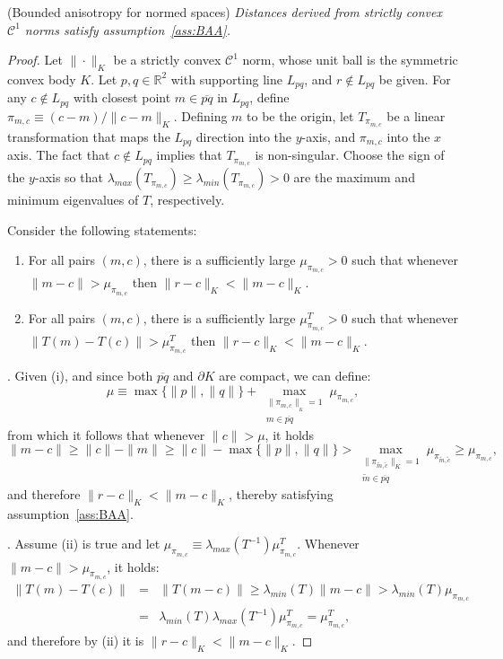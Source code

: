 \documentclass[11pt]{article}
\begin{document}
 (Bounded anisotropy for normed spaces)\emph{
	Distances derived from strictly convex $\mathcal{C}^1$ norms satisfy assumption~\ref{ass:BAA}.
}
\begin{proof}
Let $\|\cdot\|_K$ be a strictly convex $\mathcal{C}^1$ norm, whose unit ball is the symmetric convex body $K$. 
Let $p,q\in\mathbb{R}^2$ with supporting line $L_{pq}$, and $r\notin L_{pq}$ be given. 
For any $c\notin L_{pq}$ with closest point $m\in\overline{pq}$ in $L_{pq}$, define $\pi_{m,c} \equiv (c-m) / \|c-m\|_K$. 
Defining $m$ to be the origin, let $T_{\pi_{m,c}}$ be a linear transformation that maps the $L_{pq}$ direction into the ${y}$-axis, 
	and $\pi_{m,c}$ into the $x$ axis. 
The fact that $c\notin L_{pq}$ implies that $T_{\pi_{m,c}}$ is non-singular. 
Choose the sign of the $y$-axis so that $\lambda_{max}(T_{\pi_{m,c}}) \ge \lambda_{min}(T_{\pi_{m,c}}) > 0$ 
	are the maximum and minimum eigenvalues of $T$, 	respectively. 

Consider the following statements:
\begin{enumerate}[i]
\item For all pairs $(m,c)$, there is a sufficiently large $\mu_{\pi_{m,c}} > 0$ such that whenever 
	$\|m-c\| > \mu_{\pi_{m,c}}$ then $\|r-c\|_K < \|m-c\|_K$. 
\item For all pairs $(m,c)$, there is a sufficiently large $\mu^T_{\pi_{m,c}} > 0$ such that whenever
	$\|T(m) - T(c)\| > \mu^T_{\pi_{m,c}}$ then $\|r-c\|_K < \|m-c\|_K$. 
\end{enumerate}
	
\vspace*{0.05in}. 	
Given (i), and since both $\overline{pq}$ and $\partial K$ are compact, we can define:
	\[\mu \equiv \max\{ \|p\|, \|q\| \} + \displaystyle{\max_{\substack{ \|\pi_{m,c}\|_{_K} = 1 \\ m\in \overline{pq} }} \mu_{\pi_{m,c}}, }\]
from which it follows that whenever $\|c\| > \mu$, it holds
	\[ \|m - c\| \ge \|c\| - \|m\| \ge \|c\| - \max\{ \|p\|, \|q\| \} >  
			\displaystyle{\max_{\substack{ \|\pi_{\tilde{m},\tilde{c}}\|_K = 
			1 \\ \tilde{m}\in \overline{pq} }} \mu_{\pi_{\tilde{m},\tilde{c}}}} \ge \mu_{\pi_{m,c}}, \]
	and therefore $\|r-c\|_K < \|m-c\|_K$, thereby satisfying assumption~\ref{ass:BAA}. 


\vspace*{0.05in}. 	
Assume (ii) is true and let $\mu_{\pi_{m,c}} \equiv \lambda_{max}(T^{-1}) \mu^T_{\pi_{m,c}}$. 
	Whenever $\|m-c\| > \mu_{\pi_{m,c}}$, it holds:
\begin{eqnarray*}
	\|T(m) - T(c)\| &=& \|T(m-c)\| \ge \lambda_{min}(T) \|m-c\| > \lambda_{min}(T)\mu_{\pi_{m,c}} \\
			&=& \lambda_{min}(T) \lambda_{max}(T^{-1}) \mu^T_{\pi_{m,c}} = \mu^T_{\pi_{m,c}},
\end{eqnarray*}
	and therefore by (ii) it is $\|r-c\|_K < \|m-c\|_K$. 



\end{proof}
\end{document}

